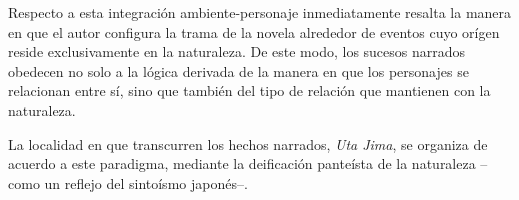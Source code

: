 Respecto a esta integración ambiente-personaje inmediatamente resalta la manera en que el autor configura la trama de la novela alrededor de eventos cuyo orígen reside exclusivamente en la naturaleza. De este modo, los sucesos narrados obedecen no solo a la lógica derivada de la manera en que los personajes se relacionan entre sí, sino que también del tipo de relación que mantienen con la naturaleza.

  La localidad en que transcurren los hechos narrados, \emph{Uta Jima}, se organiza  de acuerdo a este paradigma, mediante la deificación panteísta de la naturaleza --como un reflejo del sintoísmo japonés--. %
